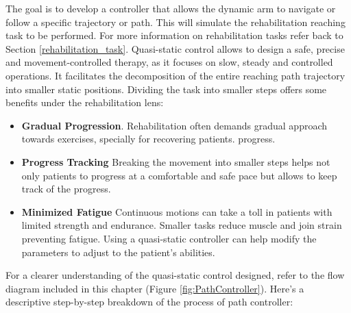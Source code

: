 The goal is to develop a controller that allows the dynamic arm  to navigate or follow a specific trajectory or path. This will simulate the rehabilitation reaching task to be performed. For more information on rehabilitation tasks refer back to Section \ref{rehabilitation_task}. Quasi-static control allows to design a safe, precise and movement-controlled therapy, as it focuses on slow, steady and controlled operations. It facilitates the decomposition of the entire reaching path trajectory into smaller static positions. Dividing the task into smaller steps offers some benefits under the rehabilitation lens:
\begin{itemize}
    \item \textbf{Gradual Progression}. Rehabilitation often demands gradual approach towards exercises, specially for recovering patients. progress.
    \item \textbf{Progress Tracking} Breaking the movement into smaller steps helps not only patients to progress at a comfortable and safe pace but allows to keep track of the progress.
    \item \textbf{Minimized Fatigue} Continuous motions can take a toll in patients with limited strength and endurance. Smaller tasks reduce muscle and join strain preventing fatigue. Using a quasi-static controller can help modify the parameters to adjust to the patient's abilities. 
\end{itemize}

For a clearer understanding of the quasi-static control designed, refer to the flow diagram included in this chapter (Figure \ref{fig:PathController}). Here’s a descriptive step-by-step breakdown of the process of path controller:

